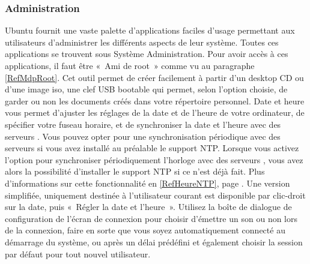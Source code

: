 \subsubsection{Administration}
Ubuntu fournit une vaste palette d'applications faciles d'usage permettant aux utilisateurs d'administrer les différents aspects de leur système. Toutes ces applications se trouvent sous Système \FlecheDroite Administration. Pour avoir accès à ces applications, il faut être «~Ami de root~» comme vu au paragraphe \ref{RefMdpRoot}.
Cet outil permet de créer facilement à partir d'un desktop CD ou d'une image iso, une clef USB bootable qui permet, selon l'option choisie, de garder ou non les documents créés dans votre répertoire personnel.
Date et heure vous permet d'ajuster les réglages de la date et de l'heure de votre ordinateur, de spécifier votre fuseau horaire, et de synchroniser la date et l'heure avec des serveurs . Vous pouvez opter pour une synchronisation périodique avec des serveurs  si vous avez installé au préalable le support NTP. Lorsque vous activez l'option pour synchroniser périodiquement l'horloge avec des serveurs , vous avez alors la possibilité d'installer le support NTP si ce n'est déjà fait. Plus d'informations sur cette fonctionnalité en \ref{RefHeureNTP}, page \pageref{RefHeureNTP}. Une version simplifiée, uniquement destinée à l'utilisateur courant est disponible par clic-droit sur la date, puis «~Régler la date et l'heure~».
Utilisez la boîte de dialogue de configuration de l'écran de connexion pour choisir d'émettre un son ou non lors de la connexion, faire en sorte que vous soyez automatiquement connecté au démarrage du système, ou après un délai prédéfini et également choisir la session par défaut pour tout nouvel utilisateur.

